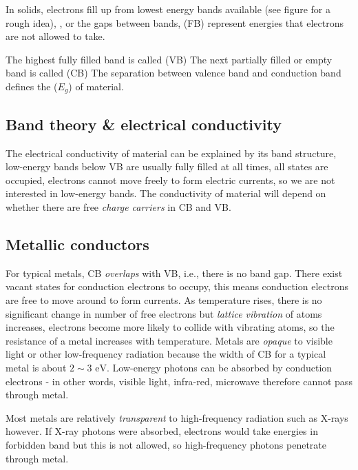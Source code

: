 In solids, electrons fill up from lowest energy bands available (see figure for a rough idea), , or the gaps between bands, (FB) represent energies that electrons are not allowed to take. 

The highest fully filled band is called  (VB)
The next partially filled or empty band is called  (CB)
The separation between valence band and conduction band defines the  ($E_g$) of material.


\subsection{Band theory \& electrical conductivity}\label{band-theory}

The electrical conductivity of material can be explained by its band structure, low-energy bands below VB are usually fully filled at all times, all states are occupied, electrons cannot move freely to form electric currents, so we are not interested in low-energy bands. The conductivity of material will depend on whether there are free \emph{charge carriers} in CB and VB.


\subsection*{Metallic conductors}

For typical metals, CB \emph{overlaps} with VB, i.e., there is no band gap. There exist vacant states for conduction electrons to occupy, this means conduction electrons are free to move around to form currents. As temperature rises, there is no significant change in number of free electrons but \emph{lattice vibration} of atoms increases, electrons become more likely to collide with vibrating atoms, so the resistance of a metal increases with temperature. Metals are \emph{opaque} to visible light or other low-frequency radiation because the width of CB for a typical metal is about $2\sim3 \text{ eV}$. Low-energy photons can be absorbed by conduction electrons - in other words, visible light, infra-red, microwave therefore cannot pass through metal.

Most metals are relatively \emph{transparent} to high-frequency radiation such as X-rays however. If X-ray photons were absorbed, electrons would take energies in forbidden band but this is not allowed, so high-frequency photons penetrate through metal.

